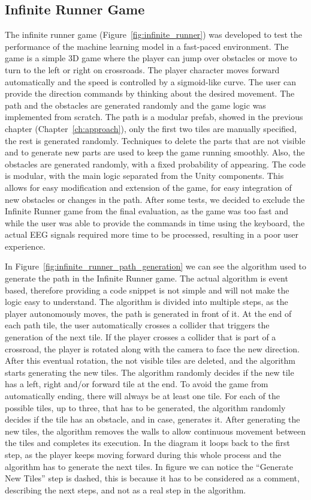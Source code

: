 \subsection*{Infinite Runner Game}
The infinite runner game (Figure~\ref{fig:infinite_runner}) was developed to test the performance of the machine learning model in a fast-paced environment.
The game is a simple 3D game where the player can jump over obstacles or move to turn to the left or right on crossroads.
The player character moves forward automatically and the speed is controlled by a sigmoid-like curve.
The user can provide the direction commands by thinking about the desired movement.
The path and the obstacles are generated randomly and the game logic was implemented from scratch.
The path is a modular prefab, showed in the previous chapter (Chapter~\ref{ch:approach}), only the first two tiles are manually specified, the rest is generated randomly.
Techniques to delete the parts that are not visible and to generate new parts are used to keep the game running smoothly.
Also, the obstacles are generated randomly, with a fixed probability of appearing.
The code is modular, with the main logic separated from the Unity components.
This allows for easy modification and extension of the game, for easy integration of new obstacles or changes in the path.
After some tests, we decided to exclude the Infinite Runner game from the final evaluation, as the game was too fast and while the user was able to provide the commands in time using the keyboard, the actual EEG signals required more time to be processed, resulting in a poor user experience. 

In Figure~\ref{fig:infinite_runner_path_generation} we can see the algorithm used to generate the path in the Infinite Runner game.
The actual algorithm is event based, therefore providing a code snippet is not simple and will not make the logic easy to understand.
The algorithm is divided into multiple steps, as the player autonomously moves, the path is generated in front of it.
At the end of each path tile, the user automatically crosses a collider that triggers the generation of the next tile.
If the player crosses a collider that is part of a crossroad, the player is rotated along with the camera to face the new direction.
After this eventual rotation, the not visible tiles are deleted, and the algorithm starts generating the new tiles.
The algorithm randomly decides if the new tile has a left, right and/or forward tile at the end.
To avoid the game from automatically ending, there will always be at least one tile.
For each of the possible tiles, up to three, that has to be generated, the algorithm randomly decides if the tile has an obstacle, and in case, generates it.
After generating the new tiles, the algorithm removes the walls to allow continuous movement between the tiles and completes its execution.
In the diagram it loops back to the first step, as the player keeps moving forward during this whole process and the algorithm has to generate the next tiles.
In figure we can notice the ``Generate New Tiles'' step is dashed, this is because it has to be considered as a comment, describing the next steps, and not as a real step in the algorithm.

